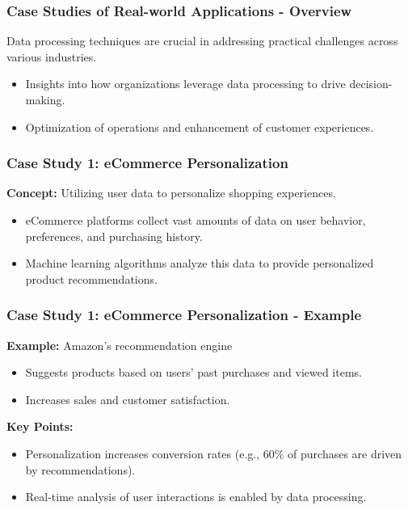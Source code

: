 \documentclass{beamer}
\begin{document}
\begin{frame}[fragile]
    \frametitle{Case Studies of Real-world Applications - Overview}
    Data processing techniques are crucial in addressing practical challenges across various industries. 

    \begin{itemize}
        \item Insights into how organizations leverage data processing to drive decision-making.
        \item Optimization of operations and enhancement of customer experiences.
    \end{itemize}
\end{frame}

\begin{frame}[fragile]
    \frametitle{Case Study 1: eCommerce Personalization}
    \textbf{Concept:} Utilizing user data to personalize shopping experiences.

    \begin{itemize}
        \item eCommerce platforms collect vast amounts of data on user behavior, preferences, and purchasing history.
        \item Machine learning algorithms analyze this data to provide personalized product recommendations.
    \end{itemize}
\end{frame}

\begin{frame}[fragile]
    \frametitle{Case Study 1: eCommerce Personalization - Example}
    \textbf{Example:} Amazon’s recommendation engine 

    \begin{itemize}
        \item Suggests products based on users’ past purchases and viewed items.
        \item Increases sales and customer satisfaction.
    \end{itemize}

    \textbf{Key Points:}
    \begin{itemize}
        \item Personalization increases conversion rates (e.g., 60\% of purchases are driven by recommendations).
        \item Real-time analysis of user interactions is enabled by data processing.
    \end{itemize}
\end{frame}
\end{document}

